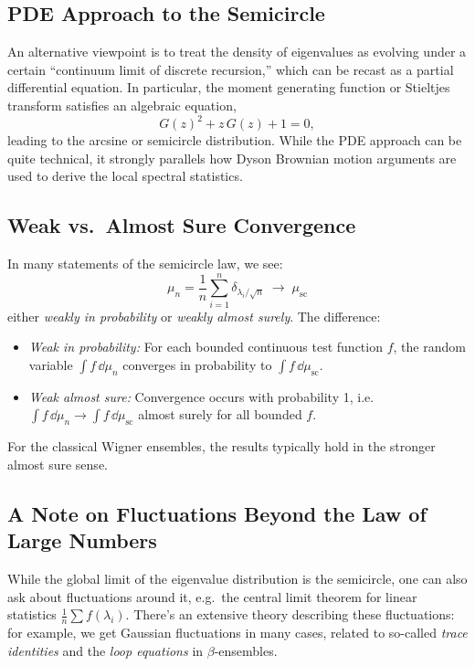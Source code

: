 \documentclass[letterpaper,11pt,oneside,reqno]{article}
\numberwithin{equation}{section}
\theoremstyle{definition}
\begin{document}
\subsection{PDE Approach to the Semicircle}

An alternative viewpoint is to treat the density of eigenvalues as evolving under a certain “continuum limit of discrete recursion,” which can be recast as a partial differential equation. In particular, the moment generating function or Stieltjes transform satisfies an algebraic equation,
\[
  G(z)^2 + z\,G(z)+1=0,
\]
leading to the arcsine or semicircle distribution. While the PDE approach can be quite technical, it strongly parallels how Dyson Brownian motion arguments are used to derive the local spectral statistics.

\subsection{Weak vs.\ Almost Sure Convergence}

In many statements of the semicircle law, we see:
\[
  \mu_n = \frac1n \sum_{i=1}^n \delta_{\lambda_i/\sqrt{n}}
  \;\longrightarrow\;
  \mu_{\mathrm{sc}}
\]
either \emph{weakly in probability} or \emph{weakly almost surely}. The difference:
\begin{itemize}
\item \emph{Weak in probability:} For each bounded continuous test function $f$, the random variable $\int f\,\dd \mu_n$ converges in probability to $\int f\,\dd \mu_{\mathrm{sc}}$.
\item \emph{Weak almost sure:} Convergence occurs with probability 1, i.e.\ \(\int f\,\dd \mu_n \to \int f\,\dd \mu_{\mathrm{sc}}\) almost surely for all bounded $f$.
\end{itemize}
For the classical Wigner ensembles, the results typically hold in the stronger almost sure sense.

\subsection{A Note on Fluctuations Beyond the Law of Large Numbers}

While the global limit of the eigenvalue distribution is the semicircle, one can also ask about fluctuations around it, e.g.\ the central limit theorem for linear statistics $\frac{1}{n}\sum f(\lambda_i)$. There's an extensive theory describing these fluctuations: for example, we get Gaussian fluctuations in many cases, related to so-called \emph{trace identities} and the \emph{loop equations} in $\beta$-ensembles.
\end{document}
